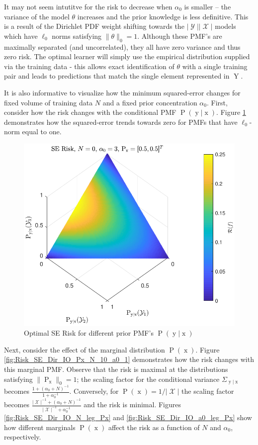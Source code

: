 \documentclass[12pt]{article}
\DeclareMathOperator{\xrm}{\mathrm{x}}
\DeclareMathOperator{\yrm}{\mathrm{y}}
\DeclareMathOperator{\Yrm}{\mathrm{Y}}
\DeclareMathOperator{\Prm}{\mathrm{P}}
\DeclareMathOperator{\Xcal}{\mathcal{X}}
\DeclareMathOperator{\Ycal}{\mathcal{Y}}
\begin{document}
It may not seem intutitve for the risk to decrease when $\alpha_0$ is smaller -- the variance of the model $\theta$ increases and the prior knowledge is less definitive. This is a result of the Dirichlet PDF weight shifting towards the $|\Ycal||\Xcal|$ models which have $\ell_0$ norms satisfying $\| \theta \|_0 = 1$. Although these PMF's are maximally separated (and uncorrelated), they all have zero variance and thus zero risk. The optimal learner will simply use the empirical distribution supplied via the training data - this allows exact identification of $\theta$ with a single training pair and leads to predictions that match the single element represented in $\Yrm$.

It is also informative to visualize how the minimum squared-error changes for fixed volume of training data $N$ and a fixed prior concentration $\alpha_0$. First, consider how the risk changes with the conditional PMF $\Prm(\yrm | \xrm)$. Figure \ref{fig:Risk_SE_Dir_IO_Pyx} demonstrates how the squared-error trends towards zero for PMFs that have $\ell_0$-norm equal to one.
\begin{figure}
\centering
\includegraphics[scale=1.0]{Risk_SE_Dir_IO_Pyx.pdf}
\caption{Optimal SE Risk for different prior PMF's $\Prm(\yrm | \xrm)$}
\label{fig:Risk_SE_Dir_IO_Pyx}
\end{figure}
Next, consider the effect of the marginal distribution $\Prm(\xrm)$. Figure \ref{fig:Risk_SE_Dir_IO_Px_N_10_a0_1} demonstrates how the risk changes with this marginal PMF. Observe that the risk is maximal at the distributions satisfying $\| \Prm_{\xrm} \|_0 = 1$; the scaling factor for the conditional variance $\Sigma_{\yrm | \xrm}$ becomes $\frac{1 + (\alpha_0+N)^{-1}}{1 + \alpha_0^{-1}}$. Conversely, for $\Prm(\xrm) = 1/|\Xcal|$ the scaling factor becomes $\frac{|\Xcal|^{-1} + (\alpha_0+N)^{-1}}{|\Xcal|^{-1} + \alpha_0^{-1}}$ and the risk is minimal. Figures \ref{fig:Risk_SE_Dir_IO_N_leg_Px} and \ref{fig:Risk_SE_Dir_IO_a0_leg_Px} show how different marginals $\Prm(\xrm)$ affect the risk as a function of $N$ and $\alpha_0$, respectively.
\end{document}
